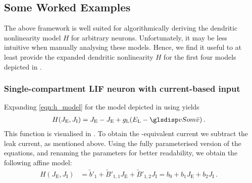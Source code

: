 \subsection{Some Worked Examples}
\label{sec:nlif_examples}

The above framework is well suited for algorithmically deriving the dendritic nonlinearity model $H$ for arbitrary \nlif neurons.
Unfortunately, it may be less intuitive when manually analysing these models.
Hence, we find it useful to at least provide the expanded dendritic nonlinearity $H$ for the first four models depicted in .

\subsubsection{Single-compartment LIF neuron with current-based input}
Expanding \cref{eqn:h_model} for the model depicted in  using  yields 
\begin{align*}
	H(J_\mathrm{E}, J_\mathrm{I}) = J_\mathrm{E} - J_\mathrm{E} + g_\mathrm{L}(E_\mathrm{L} - \vSom) \,.
\end{align*}
This function is visualised in . To obtain the \LIF-equivalent current we subtract the leak current, as mentioned above.
Using the fully parameterised version of the equations, and renaming the parameters for better readability, we obtain the following affine model:
\begin{align*}
	H(J_\mathrm{E}, J_\mathrm{I}) &= \tilde b'_1 + \tilde B'_{1, 1} J_\mathrm{E} + \tilde B'_{1, 2} J_\mathrm{I} = b_0 + b_1 J_\mathrm{E} + b_2 J_\mathrm{I} \,.
\end{align*}

